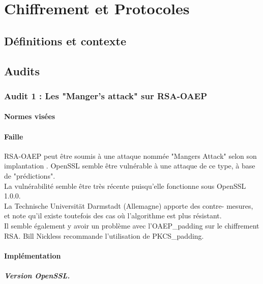 \chapter{Chiffrement et Protocoles}
\section{Définitions et contexte}

\section{Audits}
	\subsection{Audit 1 : Les "Manger's attack" sur RSA-OAEP}
		\subsubsection{Normes visées}
	
		\subsubsection{Faille}
		
			RSA-OAEP peut être soumis à une attaque nommée "Mangers Attack" 
			selon son implantation \cite{mangers2010falko}. 
			OpenSSL semble être vulnérable à une attaque de ce type, à
			base de "prédictions".\\
			La vulnérabilité semble être très récente puisqu'elle fonctionne sous
			OpenSSL 1.0.0.\\
		
			La Technische Universität Darmstadt (Allemagne) apporte des contre-
			mesures, et note qu'il existe toutefois des cas où l'algorithme est 
			plus résistant.\\
			
			Il semble également y avoir un problème avec l'OAEP\_padding sur le 
			chiffrement RSA. Bill Nickless recommande l'utilisation de 
			PKCS\_padding. \cite{sourceforgeRSAbroken}	\\
		
		
		\subsubsection{Implémentation}
			
			\paragraph{Version OpenSSL.\\}
			
